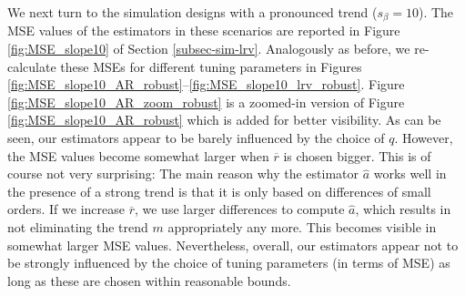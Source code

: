 We next turn to the simulation designs with a pronounced trend ($s_\beta = 10$). The MSE values of the estimators in these scenarios are reported in Figure \ref{fig:MSE_slope10} of Section \ref{subsec-sim-lrv}. Analogously as before, we re-calculate these MSEs for different tuning parameters in Figures \ref{fig:MSE_slope10_AR_robust}--\ref{fig:MSE_slope10_lrv_robust}. Figure \ref{fig:MSE_slope10_AR_zoom_robust} is a zoomed-in version of Figure \ref{fig:MSE_slope10_AR_robust} which is added for better visibility. As can be seen, our estimators appear to be barely influenced by the choice of $q$. However, the MSE values become somewhat larger when $\overline{r}$ is chosen bigger. This is of course not very surprising: The main reason why the estimator $\widehat{a}$ works well in the presence of a strong trend is that it is only based on differences of small orders. If we increase $\overline{r}$, we use larger differences to compute $\widehat{a}$, which results in not eliminating the trend $m$ appropriately any more. This becomes visible in somewhat larger MSE values. Nevertheless, overall, our estimators appear not to be strongly influenced by the choice of tuning parameters (in terms of MSE) as long as these are chosen within reasonable bounds. 


